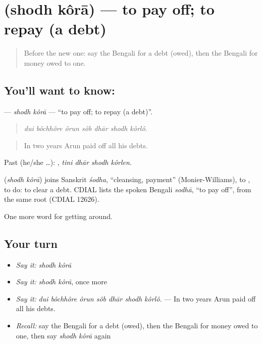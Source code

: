 \section[\texorpdfstring{\bn{শোধ} \bn{করা} (shodh kôrā)}{শোধ করা (shodh kôrā)}]{  (shodh kôrā) — to pay off; to repay (a debt)}

\label{lesson:BN-C416-shodh-kora}



\begin{quote}
Before the new one: say the Bengali for a debt (owed), then the Bengali for money owed to one.
\end{quote}

\subsection*{You'll want to know:  }
\textbf{ } — \emph{shodh kôrā} — \textquotedblleft{}to pay off; to repay (a debt)\textquotedblright{}.

\begin{quote}
      
\end{quote}

\begin{quote}
\emph{dui bôchhôre ôrun sôb dhār shodh kôrlô.}
\end{quote}

\begin{quote}
In two years Arun paid off all his debts.
\end{quote}

Past (he/she …):    , \emph{tini dhār shodh kôrlen}.

\begin{cousinweb}
\textbf{ } (\emph{shodh kôrā}) joins Sanskrit \emph{śodha}, \textquotedblleft{}cleansing, payment\textquotedblright{} (Monier-Williams), to , to do: to clear a debt. CDIAL lists the spoken Bengali \emph{sodhā}, \textquotedblleft{}to pay off\textquotedblright{}, from the same root (CDIAL 12626).
\end{cousinweb}

\begin{grammarlens}[title={What you've built}]
One more word for getting around.
\end{grammarlens}

\subsection*{Your turn}
\begin{itemize}
\raggedright
  \item \emph{Say it:} \emph{shodh kôrā}
  \item \emph{Say it:} \emph{shodh kôrā}, once more
  \item \emph{Say it:} \emph{dui bôchhôre ôrun sôb dhār shodh kôrlô.} — In two years Arun paid off all his debts.
  \item \emph{Recall:} say the Bengali for a debt (owed), then the Bengali for money owed to one, then say \emph{shodh kôrā} again
\end{itemize}

